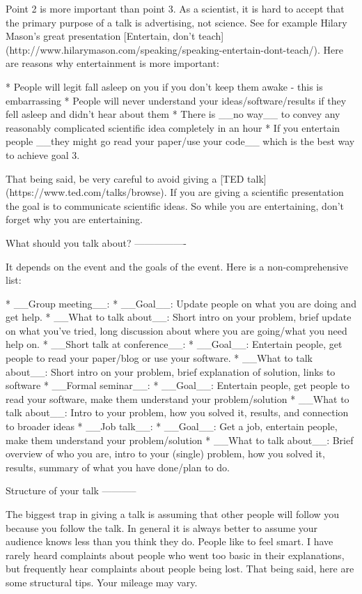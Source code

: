 \documentclass[12pt]{article}
\begin{document}
Point 2 is more important than point 3. As a scientist, it is hard to accept that the primary purpose of a talk is advertising, not science. See for example Hilary Mason's great presentation [Entertain, don't teach](http://www.hilarymason.com/speaking/speaking-entertain-dont-teach/). Here are reasons why entertainment is more important:

* People will legit fall asleep on you if you don't keep them awake - this is embarrassing
* People will never understand your ideas/software/results if they fell asleep and didn't hear about them
* There is __no way__ to convey any reasonably complicated scientific idea completely in an hour
* If you entertain people __they might go read your paper/use your code__ which is the best way to achieve goal 3. 

That being said, be very careful to avoid giving a [TED talk](https://www.ted.com/talks/browse). If you are giving a scientific presentation the goal is to communicate scientific ideas. So while you are entertaining, don't forget why you are entertaining. 


What should you talk about?
----------------

It depends on the event and the goals of the event. Here is a non-comprehensive list:

* __Group meeting__: 
  * __Goal__: Update people on what you are doing and get help.
  * __What to talk about__: Short intro on your problem, brief update on what you've tried, long discussion about where you are going/what you need help on. 
* __Short talk at conference__:
  * __Goal__: Entertain people, get people to read your paper/blog or use your software. 
  * __What to talk about__: Short intro on your problem, brief explanation of solution, links to software
* __Formal seminar__: 
  * __Goal__: Entertain people, get people to read your software, make them understand your problem/solution
  * __What to talk about__: Intro to your problem, how you solved it, results, and connection to broader ideas
* __Job talk__: 
  * __Goal__: Get a job, entertain people, make them understand your problem/solution
  * __What to talk about__: Brief overview of who you are, intro to your (single) problem, how you solved it, results, summary of what you have done/plan to do. 


Structure of your talk
-----------

The biggest trap in giving a talk is assuming that other people will follow you because you follow the talk. In general it is always better to assume your audience knows less than you think they do. People like to feel smart. I have rarely heard complaints about people who went too basic in their explanations, but frequently hear complaints about people being lost. That being said, here are some structural tips. Your mileage may vary. 
\end{document}
